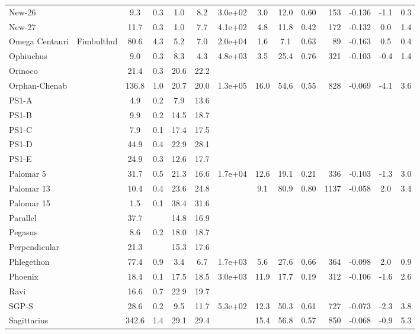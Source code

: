 \begin{tabular}{llSSSSSSSSrSSS}
New-26 &  & 9.3 & 0.3 & 1.0 & 8.2 & 3.0e+02 & 3.0 & 12.0 & 0.60 & 153 & -0.136 & -1.1 & 0.3 \\
New-27 &  & 11.7 & 0.3 & 1.0 & 7.7 & 4.1e+02 & 4.8 & 11.8 & 0.42 & 172 & -0.132 & 0.0 & 1.4 \\
Omega Centauri & Fimbulthul & 80.6 & 4.3 & 5.2 & 7.0 & 2.0e+04 & 1.6 & 7.1 & 0.63 & 89 & -0.163 & 0.5 & 0.4 \\
Ophiuchus &  & 9.0 & 0.3 & 8.3 & 4.3 & 4.8e+03 & 3.5 & 25.4 & 0.76 & 321 & -0.103 & -0.4 & 1.4 \\
Orinoco &  & 21.4 & 0.3 & 20.6 & 22.2 &  &  &  &  &  &  &  &  \\
Orphan-Chenab &  & 136.8 & 1.0 & 20.7 & 20.0 & 1.3e+05 & 16.0 & 54.6 & 0.55 & 828 & -0.069 & -4.1 & 3.6 \\
PS1-A &  & 4.9 & 0.2 & 7.9 & 13.6 &  &  &  &  &  &  &  &  \\
PS1-B &  & 9.9 & 0.2 & 14.5 & 18.7 &  &  &  &  &  &  &  &  \\
PS1-C &  & 7.9 & 0.1 & 17.4 & 17.5 &  &  &  &  &  &  &  &  \\
PS1-D &  & 44.9 & 0.4 & 22.9 & 28.1 &  &  &  &  &  &  &  &  \\
PS1-E &  & 24.9 & 0.3 & 12.6 & 17.7 &  &  &  &  &  &  &  &  \\
Palomar 5 &  & 31.7 & 0.5 & 21.3 & 16.6 & 1.7e+04 & 12.6 & 19.1 & 0.21 & 336 & -0.103 & -1.3 & 3.0 \\
Palomar 13 &  & 10.4 & 0.4 & 23.6 & 24.8 &  & 9.1 & 80.9 & 0.80 & 1137 & -0.058 & 2.0 & 3.4 \\
Palomar 15 &  & 1.5 & 0.1 & 38.4 & 31.6 &  &  &  &  &  &  &  &  \\
Parallel &  & 37.7 &  & 14.8 & 16.9 &  &  &  &  &  &  &  &  \\
Pegasus &  & 8.6 & 0.2 & 18.0 & 18.7 &  &  &  &  &  &  &  &  \\
Perpendicular &  & 21.3 &  & 15.3 & 17.6 &  &  &  &  &  &  &  &  \\
Phlegethon &  & 77.4 & 0.9 & 3.4 & 6.7 & 1.7e+03 & 5.6 & 27.6 & 0.66 & 364 & -0.098 & 2.0 & 0.9 \\
Phoenix &  & 18.4 & 0.1 & 17.5 & 18.5 & 3.0e+03 & 11.9 & 17.7 & 0.19 & 312 & -0.106 & -1.6 & 2.6 \\
Ravi &  & 16.6 & 0.7 & 22.9 & 19.7 &  &  &  &  &  &  &  &  \\
SGP-S &  & 28.6 & 0.2 & 9.5 & 11.7 & 5.3e+02 & 12.3 & 50.3 & 0.61 & 727 & -0.073 & -2.3 & 3.8 \\
Sagittarius &  & 342.6 & 1.4 & 29.1 & 29.4 &  & 15.4 & 56.8 & 0.57 & 850 & -0.068 & -0.9 & 5.3 \\

\end{tabular}

